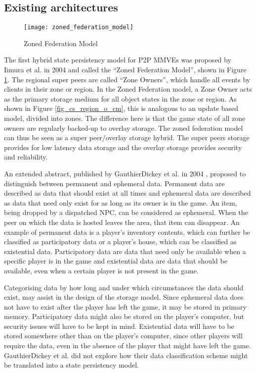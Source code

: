 \subsection{Existing architectures}

\begin{figure}[htbp]
 \centering
 \texttt{[image: zoned\_federation\_model]}
 \caption{Zoned Federation Model \cite{zoned_federation}}
 \label{fig_zoned_federation_model}
\end{figure}
%
The first hybrid state persistency model for P2P MMVEs was proposed by Iimura et al. in 2004 \cite{zoned_federation} and called the ``Zoned
Federation Model'', shown in Figure \ref{fig_zoned_federation_model}. The regional super peers are called ``Zone Owners'', which handle all events by
clients in their zone or region. In the Zoned Federation model, a Zone Owner acts as the primary storage medium for all object states in the zone or
region. As shown in Figure \ref{fig_cs_region_o_cm}, this is analogous to an update based model, divided into zones. The difference here is that the
game state of all zone owners are regularly backed-up to overlay storage. The zoned federation model can thus be seen as a super peer/overlay storage
hybrid. The super peers storage provides for low latency data storage and the overlay storage provides security and reliability.

An extended abstract, published by GauthierDickey et al. in 2004 \cite{hybrid_storage1}, proposed to distinguish between permanent and ephemeral
data. Permanent data are described as data that should exist at all times and ephemeral data are described as data that need only exist for as long
as its owner is in the game. An item, being dropped by a dispatched NPC, can be considered as ephemeral. When the peer on which the data is hosted
leaves the area, that item can disappear. An example of permanent data is a player's inventory contents, which can further be classified as
participatory data or a player's house, which can be classified as existential data. Participatory data are data that need only be available when a
specific player is in the game and existential data are data that should be available, even when a certain player is not present in the game.

Categorising data by how long and under which circumstances the data should exist, may assist in the design of the storage model. Since ephemeral
data does not have to exist after the player has left the game, it may be stored in primary memory. Participatory data might also be stored on the
player's computer, but security issues will have to be kept in mind. Existential data will have to be stored somewhere other than on the player's
computer, since other players will require the data, even in the absence of the player that might have left the game. GauthierDickey et al. did not
explore how their data classification scheme might be translated into a state persistency model.

